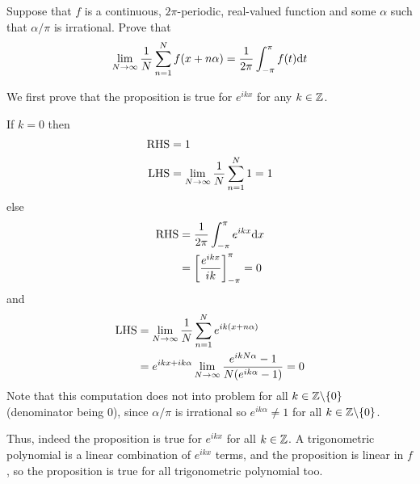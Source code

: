 \documentclass[a4paper, 12pt]{article}
\begin{document}
\begin{problem} 
    Suppose that $f$ is a continuous, $2\pi$-periodic, real-valued function and some $\alpha$ such that $\alpha/\pi$ is irrational. Prove that \begin{equation*}
    \lim_{N \to \infty} \frac{1}{N} \sum_{n=1}^{N} f(x + n \alpha) = \frac{1}{2\pi} \int_{-\pi}^{\pi} f(t) \mathrm{d} t
    \end{equation*}
\end{problem}
\begin{solution}
We first prove that the proposition is true for $e^{ikx}$ for any $k \in \mathbb{Z}$.

If $k = 0$ then \begin{align*}
    \mathrm{RHS} &= 1 \\
    \mathrm{LHS} &= \lim_{N \to \infty} \frac{1}{N} \sum_{n=1}^{N} 1 = 1
\end{align*}
else 
\begin{align*}
    \mathrm{RHS} &= \frac{1}{2\pi} \int_{-\pi}^{\pi} e^{ikx} \mathrm{d} x \\
    &= \left[\frac{e^{ikx}}{ik}\right]^{\pi}_{-\pi}  = 0
\end{align*}
and \begin{align*}
    \mathrm{LHS} &= \lim_{N \to \infty} \frac{1}{N} \sum_{n=1}^{N} e^{ik(x + n \alpha)} \\
    &= e^{ikx + ik\alpha} \lim_{N \to \infty} \frac{e^{ikN\alpha} - 1}{N(e^{ik\alpha} - 1)} = 0
\end{align*}
Note that this computation does not into problem for all $k \in \mathbb{Z} \backslash \{0\}$ (denominator being 0), since $\alpha / \pi $ is irrational so $e^{ik\alpha} \neq 1$ for all $k \in \mathbb{Z}  \backslash \{0\}$.

Thus, indeed the proposition is true for $e^{ikx}$ for all $k \in \mathbb{Z}$. A trigonometric polynomial is a linear combination of $e^{ikx}$ terms, and the proposition is linear in $f$, so the proposition is true for all trigonometric polynomial too.


\end{solution}
\end{document}
